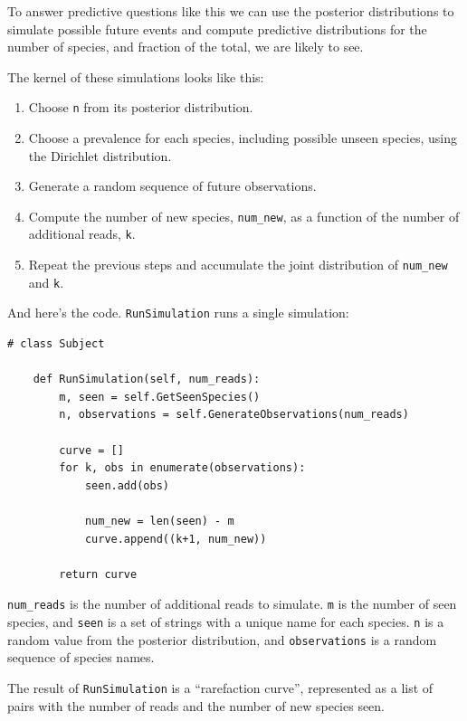 \documentclass[12pt]{book}
\begin{document}
To answer predictive questions like this we can use the posterior
distributions to simulate possible future events and compute
predictive distributions for the number of species, and fraction of
the total, we are likely to see.

The kernel of these simulations looks like this:

\begin{enumerate}

\item Choose {\tt n} from its posterior distribution.

\item Choose a prevalence for each species, including possible unseen
  species, using the Dirichlet distribution.

\item Generate a random sequence of future observations.

\item Compute the number of new species, \verb"num_new", as a function
  of the number of additional reads, {\tt k}.

\item Repeat the previous steps and accumulate the joint distribution
  of \verb"num_new" and {\tt k}.

\end{enumerate}

And here's the code.  {\tt RunSimulation} runs a single simulation:

\begin{verbatim}
# class Subject

    def RunSimulation(self, num_reads):
        m, seen = self.GetSeenSpecies()
        n, observations = self.GenerateObservations(num_reads)

        curve = []
        for k, obs in enumerate(observations):
            seen.add(obs)

            num_new = len(seen) - m
            curve.append((k+1, num_new))

        return curve
\end{verbatim}

\verb"num_reads" is the number of additional reads to simulate.
{\tt m} is the number of seen species, and {\tt seen} is a set of
strings with a unique name for each species.
{\tt n} is a random value from the posterior distribution, and
{\tt observations} is a random sequence of species names.

The result of {\tt RunSimulation} is a ``rarefaction curve'',
represented as a list of pairs with the number of reads and
the number of new species seen.
\end{document}
